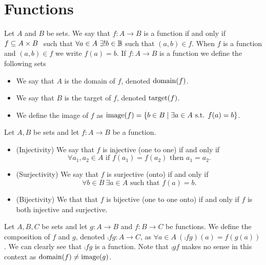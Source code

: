     \section{Functions}
        \begin{definition}
            Let $A$ and $B$ be sets. We say that $f : A \rightarrow B$ is a function if 
            and only if $f \subseteq A \times B \ $ such that
            $\forall a \in A \ \exists ! b \in \mathbb{B}$ such that $(a, b) \in f$.
            When $f$ is a function and $(a, b) \in f$ we write $f(a) = b$. If
            $f: A \rightarrow B$ is a function we define the following sets
            \begin{itemize}
                \item
                    We say that $A$ is the domain of $f$, denoted $\mathrm{domain}(f)$.
                \item
                    We say that $B$ is the target of $f$, denoted $\mathrm{target}(f)$.
                \item
                    We define the image of $f$ as 
                    $\mathrm{image}(f) = \left\{b \in B \mid \exists a \in A \mbox{ s.t. } f(a) = b\right\}$.
            \end{itemize}
        \end{definition}
        \begin{definition}
            Let $A, B$ be sets and let $f : A \rightarrow B$ be a function.
            \begin{itemize}
                \item
                    (Injectivity) We say that $f$ is injective (one to one) if and only if
                    \[
                        \forall a_1, a_2 \in A \mbox{ if } f(a_1) = f(a_2) \mbox{ then } a_1 = a_2.
                    \]
                \item
                    (Surjectivity) We say that $f$ is surjective (onto) if and only if
                    \[
                        \forall b \in B \ \exists a \in A \mbox{ such that } f(a) = b.
                    \]
                \item
                    (Bijectivity) We that that $f$ is bijective (one to one onto)
                    if and only if $f$ is both injective and surjective.
            \end{itemize}
        \end{definition}
        \begin{definition}
            Let $A, B, C$ be sets and let $g: A \rightarrow B$ and $f: B \rightarrow C$
            be functions. We define the composition of $f$ and $g$, denoted
            $\comp{f}{g}: A \rightarrow C$, as $\forall a \in A \ (\comp{f}{g})(a) = f(g(a))$.
            We can clearly see that $\comp{f}{g}$ is a function. Note that $\comp{g}{f}$
            makes no sense in this context as $\mathrm{domain}(f) \neq \mathrm{image}(g)$.
        \end{definition}
